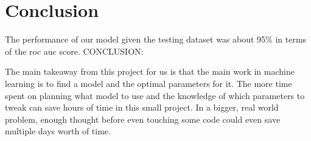 \documentclass[a4, 10 pt, conference]{ieeeconf}  %
\begin{document}
\section{Conclusion}
\label{sec:con}

{\color{black}

  \begin{itemize}
  The performance of our model given the testing dataset was about 95\% in terms of the roc auc score.\newline
\textbfn CONCLUSION:

The main takeaway from this project for us is that the main work in machine learning is to find a model and the optimal parameters for it. The more time spent on planning what model to use and the knowledge of which parameters to tweak can save hours of time in this small project. In a bigger, real world problem, enough thought before even touching some code could even save multiple days worth of time.
  \end{itemize}

}

\end{document}
